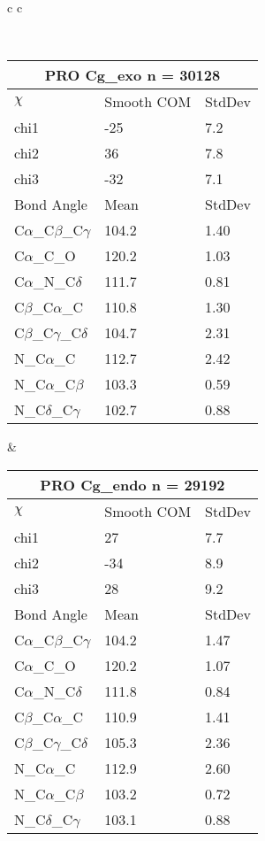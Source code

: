 \begin{longtable}{ c c }

\caption{PRO Central Values}\\
  \begin{tabular}{ l l l }
  \toprule
  \multicolumn{3}{c}{PRO \textbf{Cg\_exo} n = 30128} \\ \toprule
  $\chi$       & Smooth COM & StdDev \\ \midrule
  chi1 & -25 & 7.2 \\ 
  chi2 & 36 & 7.8 \\ 
  chi3 & -32 & 7.1 \\ \midrule
  Bond Angle   & Mean     & StdDev \\ \midrule
  C$\alpha$\_C$\beta$\_C$\gamma$ & 104.2 & 1.40\\
  C$\alpha$\_C\_O & 120.2 & 1.03\\
  C$\alpha$\_N\_C$\delta$ & 111.7 & 0.81\\
  C$\beta$\_C$\alpha$\_C & 110.8 & 1.30\\
  C$\beta$\_C$\gamma$\_C$\delta$ & 104.7 & 2.31\\
  N\_C$\alpha$\_C & 112.7 & 2.42\\
  N\_C$\alpha$\_C$\beta$ & 103.3 & 0.59\\
  N\_C$\delta$\_C$\gamma$ & 102.7 & 0.88\\
  \bottomrule
  \end{tabular}
  &
  \begin{tabular}{ l l l }
  \toprule
  \multicolumn{3}{c}{PRO \textbf{Cg\_endo} n = 29192} \\ \toprule
  $\chi$       & Smooth COM & StdDev \\ \midrule
  chi1 & 27 & 7.7 \\ 
  chi2 & -34 & 8.9 \\ 
  chi3 & 28 & 9.2 \\ \midrule
  Bond Angle   & Mean     & StdDev \\ \midrule
  C$\alpha$\_C$\beta$\_C$\gamma$ & 104.2 & 1.47\\
  C$\alpha$\_C\_O & 120.2 & 1.07\\
  C$\alpha$\_N\_C$\delta$ & 111.8 & 0.84\\
  C$\beta$\_C$\alpha$\_C & 110.9 & 1.41\\
  C$\beta$\_C$\gamma$\_C$\delta$ & 105.3 & 2.36\\
  N\_C$\alpha$\_C & 112.9 & 2.60\\
  N\_C$\alpha$\_C$\beta$ & 103.2 & 0.72\\
  N\_C$\delta$\_C$\gamma$ & 103.1 & 0.88\\
  \bottomrule
  \end{tabular}
  \\
  
\end{longtable}

